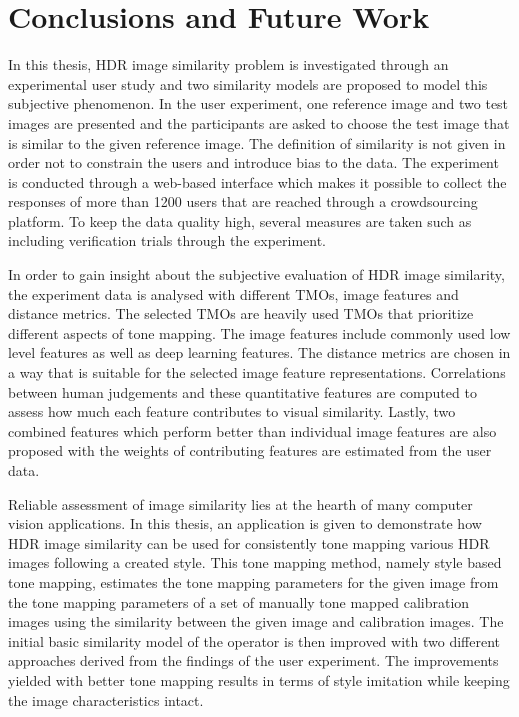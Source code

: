 \chapter{Conclusions and Future Work}
\label{chp:b7}

In this thesis, HDR image similarity problem is investigated through an experimental user study and two similarity models are proposed to model this subjective phenomenon. In the user experiment, one reference image and two test images are presented and the participants are asked to choose the test image that is similar to the given reference image. The definition of similarity is not given in order not to constrain the users and introduce bias to the data. The experiment is conducted through a web-based interface which makes it possible to collect the responses of more than 1200 users that are reached through a crowdsourcing platform. To keep the data quality high, several measures are taken such as including verification trials through the experiment.

In order to gain insight about the subjective evaluation of HDR image similarity, the experiment data is analysed with different TMOs, image features and distance metrics. The selected TMOs are heavily used TMOs that prioritize different aspects of tone mapping. The image features include commonly used low level features as well as deep learning features. The distance metrics are chosen in a way that is suitable for the selected image feature representations. Correlations between human judgements and these quantitative features are computed to assess how much each feature contributes to visual similarity. Lastly, two combined features which perform better than individual image features are also proposed with the weights of contributing features are estimated from the user data. 

Reliable assessment of image similarity lies at the hearth of many computer vision applications. In this thesis, an application is given to demonstrate how HDR image similarity can be used for consistently tone mapping various HDR images following a created style. This tone mapping method, namely style based tone mapping, estimates the tone mapping parameters for the given image from the tone mapping parameters of a set of manually tone mapped calibration images using the similarity between the given image and calibration images. The initial basic similarity model of the operator is then improved with two different approaches derived from the findings of the user experiment. The improvements yielded with better tone mapping results in terms of style imitation while keeping the image characteristics intact.

